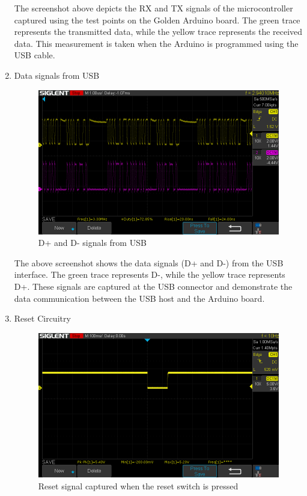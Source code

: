 \documentclass[a4paper,11pt]{article}%
\begin{document}
\begin{enumerate}
		The screenshot above depicts the RX and TX signals of the microcontroller captured using the test points on the Golden Arduino board. The green trace represents the transmitted data, while the yellow trace represents the received data. This measurement is taken when the Arduino is programmed using the USB cable.
	\item 		Data signals from USB
	\begin{figure}[H]
		\centering
		\includegraphics[scale=0.6]{figures/d-.png}
		\caption{D+ and D- signals from USB}
	\end{figure}
	
	The above screenshot shows the data signals (D+ and D-) from the USB interface. The green trace represents D-, while the yellow trace represents D+. These signals are captured at the USB connector and demonstrate the data communication between the USB host and the Arduino board.
	\item Reset Circuitry

	\begin{figure}[H]
		\centering 
		\includegraphics[scale=0.6]{figures/reset.png}
		\caption{Reset signal captured when the reset switch is pressed}
	\end{figure}
	

\end{enumerate}
\end{document}
